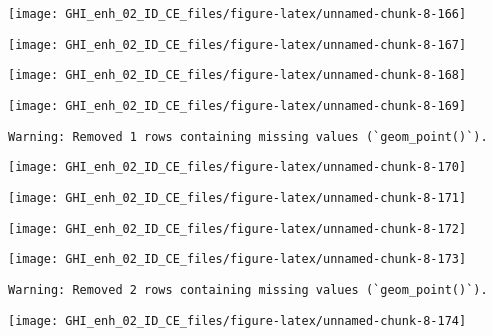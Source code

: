 \documentclass[
  10pt,
  a4paper,oneside]{article}
\begin{document}
\begin{center}\texttt{[image: GHI\_enh\_02\_ID\_CE\_files/figure-latex/unnamed-chunk-8-166]} \end{center}

\begin{center}\texttt{[image: GHI\_enh\_02\_ID\_CE\_files/figure-latex/unnamed-chunk-8-167]} \end{center}

\begin{center}\texttt{[image: GHI\_enh\_02\_ID\_CE\_files/figure-latex/unnamed-chunk-8-168]} \end{center}

\begin{center}\texttt{[image: GHI\_enh\_02\_ID\_CE\_files/figure-latex/unnamed-chunk-8-169]} \end{center}

\begin{verbatim}
Warning: Removed 1 rows containing missing values (`geom_point()`).
\end{verbatim}

\begin{center}\texttt{[image: GHI\_enh\_02\_ID\_CE\_files/figure-latex/unnamed-chunk-8-170]} \end{center}

\begin{center}\texttt{[image: GHI\_enh\_02\_ID\_CE\_files/figure-latex/unnamed-chunk-8-171]} \end{center}

\begin{center}\texttt{[image: GHI\_enh\_02\_ID\_CE\_files/figure-latex/unnamed-chunk-8-172]} \end{center}

\begin{center}\texttt{[image: GHI\_enh\_02\_ID\_CE\_files/figure-latex/unnamed-chunk-8-173]} \end{center}

\begin{verbatim}
Warning: Removed 2 rows containing missing values (`geom_point()`).
\end{verbatim}

\begin{center}\texttt{[image: GHI\_enh\_02\_ID\_CE\_files/figure-latex/unnamed-chunk-8-174]} \end{center}
\end{document}
